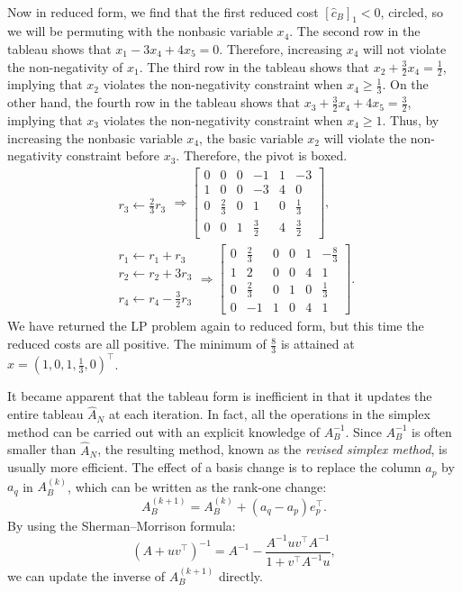 \begin{example}
\begin{align*}
\end{align*}
Now in reduced form, we find that the first reduced cost $[\hat{c}_B]_1<0$, circled, so we will be permuting with the nonbasic variable $x_4$. The second row in the tableau shows that $x_1 -3x_4 + 4x_5=0$. Therefore, increasing $x_4$ will not violate the non-negativity of $x_1$. The third row in the tableau shows that $x_2+\tfrac{3}{2}x_4 = \tfrac{1}{2}$, implying that $x_2$ violates the non-negativity constraint when $x_4\ge\tfrac{1}{3}$. On the other hand, the fourth row in the tableau shows that $x_3+\tfrac{3}{2}x_4+4x_5 = \tfrac{3}{2}$, implying that $x_3$ violates the non-negativity constraint when $x_4\ge1$. Thus, by increasing the nonbasic variable $x_4$, the basic variable $x_2$ will violate the non-negativity constraint before $x_3$. Therefore, the pivot is boxed.
\begin{align*}
\begin{array}{c} ~\\r_3 \leftarrow \tfrac{2}{3}r_3\end{array} \Rightarrow \left[\begin{array}{ccccc|c} 0 & 0 & 0 & -1 & 1 & -3\\\hline 1 & 0 & 0 & -3 & 4 & 0\\ 0 & \tfrac{2}{3} & 0 & 1 & 0 & \tfrac{1}{3}\\ 0 & 0 & 1 & \tfrac{3}{2} & 4 & \tfrac{3}{2}\end{array}\right],\\
\begin{array}{c} r_1\leftarrow r_1+r_3\\r_2\leftarrow r_2 + 3r_3\\~\\r_4\leftarrow r_4-\tfrac{3}{2}r_3\end{array} \Rightarrow \left[\begin{array}{ccccc|c} 0 & \tfrac{2}{3} & 0 & 0 & 1 & -\tfrac{8}{3}\\\hline 1 & 2 & 0 & 0 & 4 & 1\\ 0 & \tfrac{2}{3} & 0 & 1 & 0 & \tfrac{1}{3}\\ 0 & -1 & 1 & 0 & 4 & 1\end{array}\right].
\end{align*}
We have returned the LP problem again to reduced form, but this time the reduced costs are all positive. The minimum of $\tfrac{8}{3}$ is attained at $x = (1,0,1,\tfrac{1}{3},0)^\top$.
\end{example}

It became apparent that the tableau form is inefficient in that it updates the entire tableau $\hat{A}_N$ at each iteration. In fact, all the operations in the simplex method can be carried out with an explicit knowledge of $A_B^{-1}$. Since $A_B^{-1}$ is often smaller than $\hat{A}_N$, the resulting method, known as the {\em revised simplex method}, is usually more efficient. The effect of a basis change is to replace the column $a_p$ by $a_q$ in $A_B^{(k)}$, which can be written as the rank-one change:
\[
A_B^{(k+1)} = A_B^{(k)} + (a_q-a_p)e_p^\top.
\]
By using the Sherman--Morrison formula:
\[
\left(A+uv^\top\right)^{-1} = A^{-1} - \dfrac{A^{-1}uv^\top A^{-1}}{1+v^\top A^{-1}u},
\]
we can update the inverse of $A_B^{(k+1)}$ directly.

